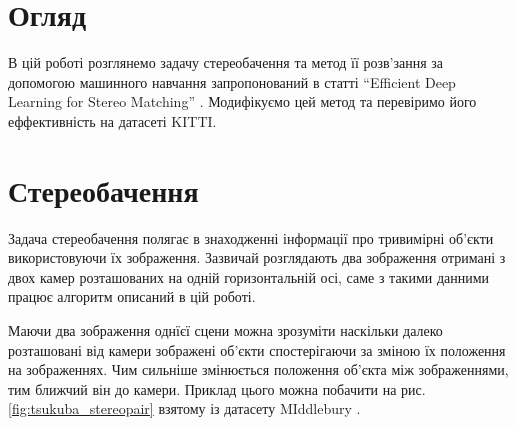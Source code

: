 \documentclass{article}
\theoremstyle{definition}
\begin{document}
\section{Огляд}
В цій роботі розглянемо задачу стереобачення та метод її розв’зання за допомогою машинного навчання запропонований в статті “Efficient Deep Learning for Stereo Matching” \cite{deepLearningForStereo}. Модифікуємо цей метод та перевіримо його еффективність на датасеті KITTI.

\section{Стереобачення}
Задача стереобачення полягає в знаходженні інформації про тривимірні об'єкти використовуючи їх зображення. Зазвичай розглядають два зображення отримані з двох камер розташованих на одній горизонтальній осі, саме з такими данними працює алгоритм описаний в цій роботі.

Маючи два зображення однїєї сцени можна зрозуміти наскільки далеко розташовані від камери зображені об'єкти спостерігаючи за зміною їх положення на зображеннях. Чим сильніше змінюється положення об'єкта між зображеннями, тим ближчий він до камери. Приклад цього можна побачити на рис. \ref{fig:tsukuba_stereopair} взятому із датасету MIddlebury \cite{middlebury2001dataset}.
\end{document}
